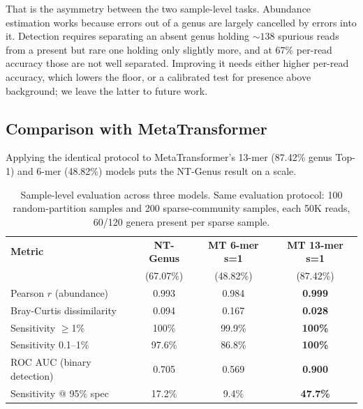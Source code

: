 That is the asymmetry between the two sample-level tasks. Abundance estimation works
because errors out of a genus are largely cancelled by errors into it. Detection
requires separating an absent genus holding ${\sim}138$ spurious reads from a present
but rare one holding only slightly more, and at 67\% per-read accuracy those are not
well separated. Improving it needs either higher per-read accuracy, which lowers the
floor, or a calibrated test for presence above background; we leave the latter to
future work.

\subsection{Comparison with MetaTransformer}
\label{sec:sample-mt-comparison}

Applying the identical protocol to MetaTransformer's 13-mer (87.42\% genus Top-1) and
6-mer (48.82\%) models puts the NT-Genus result on a scale.

\begin{table}[htbp]
    \centering
    \caption{Sample-level evaluation across three models.
    Same evaluation protocol: 100 random-partition samples and 200 sparse-community samples, each 50K reads, 60/120 genera present per sparse sample.}
    \label{tab:sample-model-comparison}
    \begin{tabular}{lccc}
        \toprule
        \textbf{Metric} & \textbf{NT-Genus} & \textbf{MT 6-mer s=1} & \textbf{MT 13-mer s=1} \\
                        & (67.07\%)          & (48.82\%)              & (87.42\%) \\
        \midrule
        Pearson $r$ (abundance)   & 0.993 & 0.984 & \textbf{0.999} \\
        Bray-Curtis dissimilarity & 0.094 & 0.167 & \textbf{0.028} \\
        Sensitivity $\geq$1\%     & 100\% & 99.9\% & \textbf{100\%} \\
        Sensitivity 0.1--1\%      & 97.6\% & 86.8\% & \textbf{100\%} \\
        ROC AUC (binary detection)& 0.705 & 0.569 & \textbf{0.900} \\
        Sensitivity @ 95\% spec   & 17.2\% & 9.4\% & \textbf{47.7\%} \\
        \bottomrule
    \end{tabular}
\end{table}

